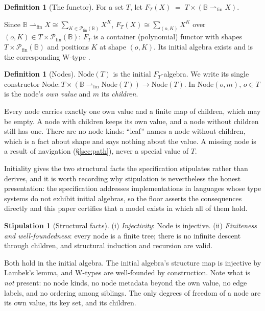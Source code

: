 \documentclass[11pt]{article}
\theoremstyle{definition}
\newtheorem{definition}[theorem]{Definition}
\newtheorem{stipulation}[theorem]{Stipulation}
\newcommand{\Bytes}{\mathbb{B}}                    %
\newcommand{\NodeT}[1]{\mathrm{Node}(#1)}
\newcommand{\finmap}[2]{#1 \rightharpoonup_{\mathrm{fin}} #2}
\begin{document}
\begin{definition}[The functor]\label{def:functor}
For a set $T$, let $F_T(X) \;=\; T \times (\finmap{\Bytes}{X})$.
\end{definition}

Since $\finmap{\Bytes}{X} \cong \sum_{K \in \mathcal{P}_{\mathrm{fin}}(\Bytes)} X^{K}$,
$F_T(X) \cong \sum_{(o, K)} X^{K}$ over $(o, K) \in T \times
\mathcal{P}_{\mathrm{fin}}(\Bytes)$: $F_T$ is a container (polynomial) functor with
shapes $T \times \mathcal{P}_{\mathrm{fin}}(\Bytes)$ and positions $K$
at shape $(o, K)$. Its initial algebra exists and is the corresponding W-type
\cite{martinlof,aag}.

\begin{definition}[Nodes]\label{def:node}
$\NodeT{T}$ is the initial $F_T$-algebra. We write its single constructor
$\mathrm{Node} : T \times (\finmap{\Bytes}{\NodeT{T}}) \to \NodeT{T}$.
In $\mathrm{Node}(o, m)$, $o \in T$ is the node's \emph{own value} and $m$ its
\emph{children}.
\end{definition}

Every node carries exactly one own value and a finite map of children, which may be
empty. A node with children keeps its own value, and a node without children still has
one. There are no node kinds: ``leaf'' names a node without children, which is a fact
about shape and says nothing about the value. A missing node is a result of navigation
(\S\ref{sec:path}), never a special value of $T$.

Initiality gives the two structural facts the specification stipulates rather than
derives, and it is worth recording why stipulation is nevertheless the honest
presentation: the specification addresses implementations in languages whose type
systems do not exhibit initial algebras, so the floor asserts the consequences
directly and this paper certifies that a model exists in which all of them hold.

\begin{stipulation}[Structural facts]\label{stip:structural}
(i) \emph{Injectivity}: $\mathrm{Node}$ is injective.
(ii) \emph{Finiteness and well-foundedness}: every node is a finite tree; there is no
infinite descent through children, and structural induction and recursion are valid.
\end{stipulation}

Both hold in the initial algebra. The initial algebra's structure map is injective
by Lambek's lemma, and W-types are well-founded by construction. Note what is \emph{not}
present: no node kinds, no node metadata beyond the own value, no edge labels, and no
ordering among siblings. The only degrees of freedom of a node are its own value, its key
set, and its children.
\end{document}
